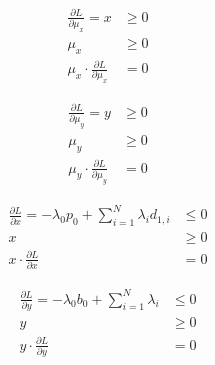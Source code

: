 \bigskip

\begin{minipage}{0.48\textwidth}
    \begin{subequations}\label{eq:lagr2,mu_x}
    \begin{align}
        \frac{\partial L}{\partial \mu_x} = x & \geq 0\\
        \mu_x & \geq 0 \\
        \mu_x \cdot \frac{\partial L}{\partial \mu_x} & = 0
    \end{align}
    \end{subequations}    
\end{minipage}\hfill
\begin{minipage}{0.48\textwidth}
    \begin{subequations}\label{eq:lagr2,mu_y}
    \begin{align}
        \frac{\partial L}{\partial \mu_y} = y & \geq 0\\
        \mu_y & \geq 0 \\
        \mu_y \cdot \frac{\partial L}{\partial \mu_y} & = 0
    \end{align}
    \end{subequations}    
\end{minipage}\hfill

\bigskip

\begin{minipage}{0.48\textwidth}
    \begin{subequations}\label{eq:lagr2,x}
    \begin{align}
        \frac{\partial L}{\partial x} = -\lambda_0 p_0 + \sum_{i=1}^{N} \lambda_i d_{1,i} & \leq 0\\
        x & \geq 0 \\
        x \cdot \frac{\partial L}{\partial x} & = 0
    \end{align}
    \end{subequations}    
\end{minipage}
\begin{minipage}{0.48\textwidth}
    \begin{subequations}\label{eq:lagr2,y}
    \begin{align}
        \frac{\partial L}{\partial y} = -\lambda_0 b_0 + \sum_{i=1}^{N} \lambda_i & \leq 0\\
        y & \geq 0 \\
        y \cdot \frac{\partial L}{\partial y} & = 0
    \end{align}
    \end{subequations}    
\end{minipage}

